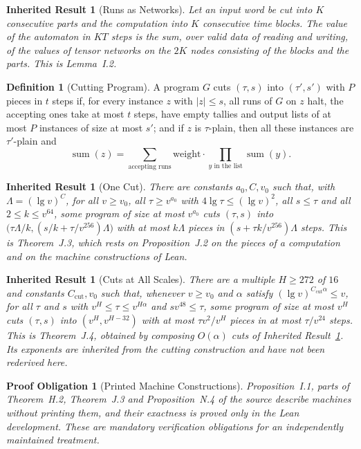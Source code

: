 \documentclass[11pt,letterpaper]{report}
\theoremstyle{plain}
\newtheorem{inherited}[theorem]{Inherited Result}
\newtheorem{obligation}[theorem]{Proof Obligation}
\theoremstyle{definition}
\newtheorem{definition}[theorem]{Definition}
\theoremstyle{remark}
\begin{document}
\begin{inherited}[Runs as Networks]\label{inh:runnet}
Let an input word be cut into $K$ consecutive parts and the computation into $K$ consecutive time blocks. The value of the automaton in $KT$ steps is the sum, over valid data of reading and writing, of the values of tensor networks on the $2K$ nodes consisting of the blocks and the parts. This is Lemma~I.2.
\end{inherited}

\begin{definition}[Cutting Program]
A program $G$ cuts $(\tau,s)$ into $(\tau',s')$ with $P$ pieces in $t$ steps if, for every instance $z$ with $|z|\le s$, all runs of $G$ on $z$ halt, the accepting ones take at most $t$ steps, have empty tallies and output lists of at most $P$ instances of size at most $s'$; and if $z$ is $\tau$-plain, then all these instances are $\tau'$-plain and
\[
\operatorname{sum}(z)=\sum_{\text{accepting runs}}\mathrm{weight}\cdot\prod_{y\text{ in the list}}\operatorname{sum}(y).
\]
\end{definition}

\begin{inherited}[One Cut]\label{inh:onecut}
There are constants $a_0,C,v_0$ such that, with $\Lambda=(\lg v)^C$, for all $v\ge v_0$, all $\tau\ge v^{a_0}$ with $4\lg\tau\le(\lg v)^2$, all $s\le\tau$ and all $2\le k\le v^{64}$, some program of size at most $v^{a_0}$ cuts $(\tau,s)$ into $\bigl(\tau\Lambda/k,(s/k+\tau/v^{256})\Lambda\bigr)$ with at most $k\Lambda$ pieces in $(s+\tau k/v^{256})\Lambda$ steps. This is Theorem~J.3, which rests on Proposition~J.2 on the pieces of a computation and on the machine constructions of Lean.
\end{inherited}

\begin{inherited}[Cuts at All Scales]\label{inh:cutall}
There are a multiple $H\ge272$ of $16$ and constants $C_{\mathrm{cut}},v_0$ such that, whenever $v\ge v_0$ and $\alpha$ satisfy $(\lg v)^{C_{\mathrm{cut}}\alpha}\le v$, for all $\tau$ and $s$ with $v^H\le\tau\le v^{H\alpha}$ and $sv^{48}\le\tau$, some program of size at most $v^H$ cuts $(\tau,s)$ into $(v^H,v^{H-32})$ with at most $\tau v^2/v^H$ pieces in at most $\tau/v^{24}$ steps. This is Theorem~J.4, obtained by composing $O(\alpha)$ cuts of Inherited Result~\ref{inh:onecut}. Its exponents are inherited from the cutting construction and have not been rederived here.
\end{inherited}

\begin{obligation}[Printed Machine Constructions]
Proposition~I.1, parts of Theorem~H.2, Theorem~J.3 and Proposition~N.4 of the source describe machines without printing them, and their exactness is proved only in the Lean development. These are mandatory verification obligations for an independently maintained treatment.
\end{obligation}
\end{document}
